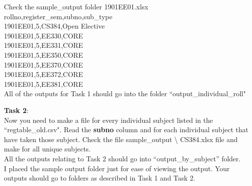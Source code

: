 \documentclass[12pt,  letterpaper,  twoside]{article}
\begin{document}
Check the sample\_output folder
\noindent 1901EE01.xlsx\\ 
rollno,register\_sem,subno,sub\_type\\
1901EE01,5,CS384,Open Elective\\
1901EE01,5,EE330,CORE\\
1901EE01,5,EE331,CORE\\
1901EE01,5,EE350,CORE\\
1901EE01,5,EE370,CORE\\
1901EE01,5,EE372,CORE\\
1901EE01,5,EE381,CORE\\

All of the outputs for Task 1 should go into the folder 
``output\_individual\_roll"
	
\textbf{Task 2}:\\
Now you need to make a file for every individual subject listed in the 
``regtable\_old.csv". Read the 	\textbf{subno} column	and for each individual 
subject that have taken those subject. Check the file  sample\_output 
\textbackslash 
CS384.xlsx file and make for all unique subjects.\\

All the outputs relating to Task 2 should go into ``output\_by\_subject'' 
folder. \\

\noindent I placed the sample output folder just for ease of viewing the 
output. Your outputs should go to folders as described in Task 1 and Task 2.
	
\end{document}

